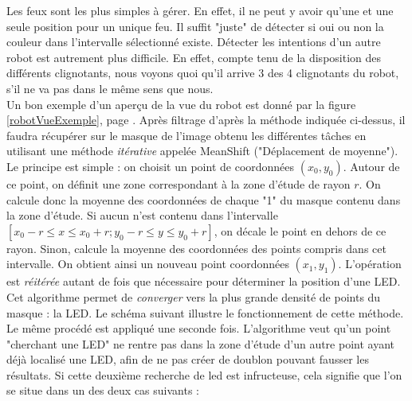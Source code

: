\begin{itemize}
					Les feux sont les plus simples à gérer. En effet, il ne peut y avoir qu'une et une seule position pour un unique feu. Il suffit "juste" de détecter si oui ou non la couleur dans l'intervalle sélectionné existe. Détecter les intentions d'un autre robot est autrement plus difficile. En effet, compte tenu de la disposition des différents clignotants, nous voyons quoi qu'il arrive 3 des 4 clignotants du robot, s'il ne va pas dans le même sens que nous. \\
					Un bon exemple d'un aperçu de la vue du robot est donné par la figure \ref{robotVueExemple}, page \pageref{robotVueExemple}.
					Après filtrage d'après la méthode indiquée ci-dessus, il faudra récupérer sur le masque de l'image obtenu les différentes tâches en utilisant une méthode \textit{itérative} appelée MeanShift ("Déplacement de moyenne"). Le principe est simple : on choisit un point de coordonnées $(x_0,y_0)$. Autour de ce point, on définit une zone correspondant à la zone d'étude de rayon $r$. On calcule donc la moyenne des coordonnées de chaque "1" du masque contenu dans la zone d'étude. Si aucun n'est contenu dans l'intervalle $[x_0 - r \leqslant x \leqslant x_0 + r ; y_0 - r \leqslant y \leqslant y_0 + r ]$, on décale le point en dehors de ce rayon. Sinon, calcule la moyenne des coordonnées des points compris dans cet intervalle. On obtient ainsi un nouveau point coordonnées $(x_1,y_1)$. L'opération est \textit{réitérée} autant de fois que nécessaire pour déterminer la position d'une LED. Cet algorithme permet de \textit{converger} vers la plus grande densité de points du masque : la LED. Le schéma suivant illustre le fonctionnement de cette méthode.
					Le même procédé est appliqué une seconde fois. L'algorithme veut qu'un point "cherchant une LED" ne rentre pas dans la zone d'étude d'un autre point ayant déjà localisé une LED, afin de ne pas créer de doublon pouvant fausser les résultats. Si cette deuxième recherche de led est infructeuse, cela signifie que l'on se situe dans un des deux cas suivants :


\end{itemize}
